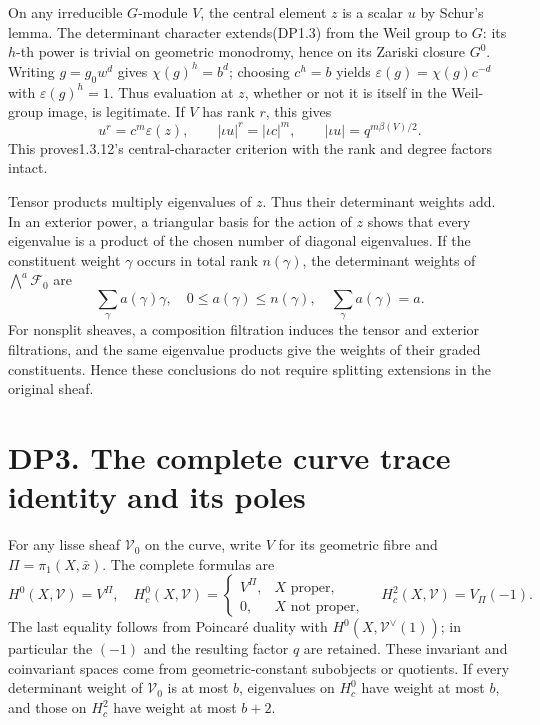 \documentclass[
]{report}
\begin{document}
On any irreducible \(G\)-module \(V\), the central element \(z\) is a
scalar \(u\) by Schur's lemma. The determinant character extends(DP1.3)
from the Weil group to \(G\): its \(h\)-th power is trivial on geometric
monodromy, hence on its Zariski closure \(G^0\). Writing \(g=g_0w^d\)
gives \(\chi(g)^h=b^d\); choosing \(c^h=b\) yields
\(\varepsilon(g)=\chi(g)c^{-d}\) with \(\varepsilon(g)^h=1\). Thus
evaluation at \(z\), whether or not it is itself in the Weil-group
image, is legitimate. If \(V\) has rank \(r\), this gives \[
u^r=c^{m}\varepsilon(z),\qquad
|\iota u|^r=|\iota c|^{m},\qquad
\boxed{|\iota u|=q^{m\beta(V)/2}.}
\tag{DP2.3}
\] This proves1.3.12's central-character criterion with the rank and
degree factors intact.

Tensor products multiply eigenvalues of \(z\). Thus their determinant
weights add. In an exterior power, a triangular basis for the action of
\(z\) shows that every eigenvalue is a product of the chosen number of
diagonal eigenvalues. If the constituent weight \(\gamma\) occurs in
total rank \(n(\gamma)\), the determinant weights of
\(\bigwedge^a\mathcal F_0\) are \[
\sum_\gamma a(\gamma)\gamma,
\quad 0\le a(\gamma)\le n(\gamma),\quad
\sum_\gamma a(\gamma)=a.
\tag{DP2.4}
\] For nonsplit sheaves, a composition filtration induces the tensor and
exterior filtrations, and the same eigenvalue products give the weights
of their graded constituents. Hence these conclusions do not require
splitting extensions in the original sheaf.

\section{DP3. The complete curve trace identity and its
poles}\label{dp3.-the-complete-curve-trace-identity-and-its-poles}

For any lisse sheaf \(\mathcal V_0\) on the curve, write \(V\) for its
geometric fibre and \(\Pi=\pi_1(X,\bar x)\). The complete formulas are
\[
H^0(X,\mathcal V)=V^\Pi,
\quad
H_c^0(X,\mathcal V)=
\begin{cases}V^\Pi,&X\text{ proper},\\0,&X\text{ not proper},\end{cases}
\quad
H_c^2(X,\mathcal V)=V_\Pi(-1).
\tag{DP3.1}
\] The last equality follows from Poincaré duality with
\(H^0(X,\mathcal V^\vee(1))\); in particular the \((-1)\) and the
resulting factor \(q\) are retained. These invariant and coinvariant
spaces come from geometric-constant subobjects or quotients. If every
determinant weight of \(\mathcal V_0\) is at most \(b\), eigenvalues on
\(H_c^0\) have weight at most \(b\), and those on \(H_c^2\) have weight
at most \(b+2\).
\end{document}
